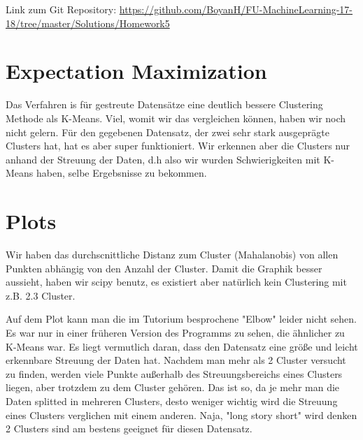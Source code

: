 \usepackage{graphicx}
\usepackage{amsmath}
\usepackage{amssymb}
\usepackage{fancyvrb}

\newcommand{\dozent}{Prof. R. Rojas}					%
\newcommand{\projectNo}{5}
\newcommand{\veranstaltung}{Mustererkennung}
\newcommand{\semester}{WS17/18}
\newcommand{\studenten}{Boyan Hristov, Nedeltscho Petrov}





Link zum Git Repository: \url{https://github.com/BoyanH/FU-MachineLearning-17-18/tree/master/Solutions/Homework\projectNo}

\section*{Expectation Maximization}

Das Verfahren is für gestreute Datensätze eine deutlich bessere Clustering Methode als K-Means. Viel, womit wir das
vergleichen können, haben wir noch nicht gelern. Für den gegebenen Datensatz, der zwei sehr stark ausgeprägte Clusters
hat, hat es aber super funktioniert. Wir erkennen aber die Clusters nur anhand der Streuung der Daten, d.h also wir
wurden Schwierigkeiten mit K-Means haben, selbe Ergebsnisse zu bekommen.

\section*{Plots}

Wir haben das durchscnittliche Distanz zum Cluster (Mahalanobis) von allen Punkten abhängig von den Anzahl der Cluster.
Damit die Graphik besser aussieht, haben wir scipy benutz, es existiert aber natürlich kein Clustering mit z.B. 2.3
Cluster.

Auf dem Plot kann man die im Tutorium besprochene "Elbow" leider nicht sehen. Es war nur in einer früheren Version
des Programms zu sehen, die ähnlicher zu K-Means war. Es liegt vermutlich daran, dass den Datensatz eine größe und
leicht erkennbare Streuung der Daten hat. Nachdem man mehr als 2 Cluster versucht zu finden, werden viele Punkte
außerhalb des Streuungsbereichs eines Clusters liegen, aber trotzdem zu dem Cluster gehören. Das ist so, da je mehr
man die Daten splitted in mehreren Clusters, desto weniger wichtig wird die Streuung eines Clusters verglichen mit einem
anderen. Naja, "long story short" wird denken 2 Clusters sind am bestens geeignet für diesen Datensatz.

